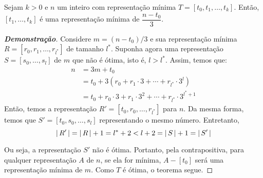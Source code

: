\begin{theorem}
    Sejam $k > 0$ e $n$ um inteiro com representação mínima $T = [t_0, t_1, \ldots, t_k]$. Então, $[t_1, \ldots, t_k]$ é uma representação mínima de $\dfrac{n - t_0}{3}$.
\end{theorem}

\begin{proof}[\textbf{Demonstração}]
    Considere $m = (n - t_0) / 3$ e sua representação mínima $R = [r_0, r_1, \ldots, r_{l^*}]$ de tamanho $l^*$. Suponha agora uma representação $S = [s_0, \ldots, s_l]$ de $m$ que não é ótima, isto é, $l > l^*$. Assim, temos que:
    \begin{align*}
        n &= 3 m + t_0 \\
        &= t_0 + 3 \left(r_0 + r_1 \cdot 3 + \cdots + r_{l^*} \cdot 3^l\right) \\
        &= t_0 + r_0 \cdot 3 + r_1 \cdot 3^2 + \cdots + r_{l^*} \cdot 3^{l^*+1}
    \end{align*}
    Então, temos a representação $R' = [t_0, r_0, \ldots, r_{l^*}]$ para $n$. Da mesma forma, temos que $S' = [t_0, s_0, \ldots, s_l]$ representando o mesmo número. Entretanto,
    \[
        {\lvert\,R'\,\rvert} = {\lvert\,R\,\rvert} + 1 = l^* + 2 < l + 2 = {\lvert\,S\,\rvert} + 1 = {\lvert\,S'\,\rvert}
    \]

    Ou seja, a representação $S'$ não é ótima. Portanto, pela contrapositiva, para qualquer representação $A$ de $n$, se ela for mínima, $A - [t_0]$ será uma representação mínima de $m$. Como $T$ é ótima, o teorema segue.
\end{proof}




